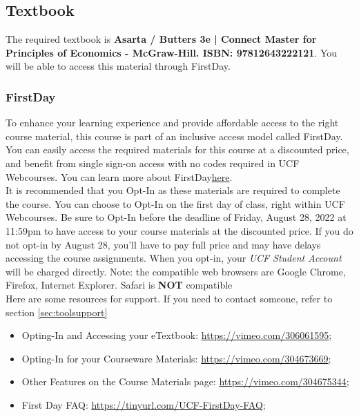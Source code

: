 \documentclass[11pt]{paper}
\begin{document}
\subsection{Textbook}

The required textbook is \textbf{Asarta / Butters 3e | Connect Master for Principles of Economics - McGraw-Hill. ISBN: 97812643222121}. You will be able to access this material through FirstDay\texttrademark.\\

\subsubsection{FirstDay\texttrademark}

To enhance your learning experience and provide affordable access to the right course material, this course is part of an inclusive access model called FirstDay\texttrademark. You can easily access the required materials for this course at a discounted price, and benefit from single sign-on access with no codes required in UCF Webcourses. You can learn more about FirstDay\texttrademark \href{https://video.mhhe.com/watch/KuB92tcunQc2TisgtWgKAE?}{here}.\\

It is recommended that you Opt-In as these materials are required to complete the course. You can choose to Opt-In on the first day of class, right within UCF Webcourses. Be sure to Opt-In before the deadline of Friday, August 28, 2022 at 11:59pm to have access to your course materials at the discounted price. If you do not opt-in by August 28, you’ll have to pay full price and may have delays accessing the course assignments. When you opt-in, your \textit{UCF Student Account} will be charged directly. Note: the compatible web browsers are Google Chrome, Firefox, Internet Explorer. Safari is \textbf{NOT} compatible\\

Here are some resources for support. If you need to contact someone, refer to section \ref{sec:toolsupport}

\begin{itemize}
\item Opting-In and Accessing your eTextbook: \href{https://vimeo.com/306061595}{https://vimeo.com/306061595};
\item Opting-In for your Courseware Materials: \href{https://vimeo.com/304673669}{https://vimeo.com/304673669};
\item Other Features on the Course Materials page: \href{https://vimeo.com/304675344}{https://vimeo.com/304675344};
\item First Day FAQ: \href{https://tinyurl.com/UCF-FirstDay-FAQ}{https://tinyurl.com/UCF-FirstDay-FAQ};
\end{itemize}
\end{document}
